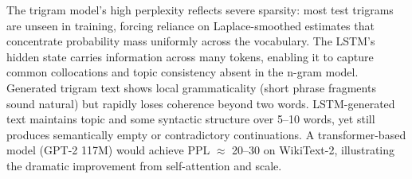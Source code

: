 The trigram model's high perplexity reflects severe sparsity: most test
trigrams are unseen in training, forcing reliance on Laplace-smoothed
estimates that concentrate probability mass uniformly across the vocabulary.
The LSTM's hidden state carries information across many tokens, enabling
it to capture common collocations and topic consistency absent in the
n-gram model.
Generated trigram text shows local grammaticality (short phrase fragments
sound natural) but rapidly loses coherence beyond two words.
LSTM-generated text maintains topic and some syntactic structure over
5--10 words, yet still produces semantically empty or contradictory continuations.
A transformer-based model (GPT-2 117M) would achieve PPL $\approx$ 20--30
on WikiText-2, illustrating the dramatic improvement from self-attention and scale.
